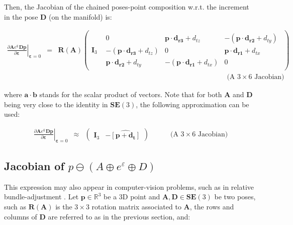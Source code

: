 \documentclass[a4paper,11pt]{report}
\newcommand{\E}{{\bm{\varepsilon}}}
\newcommand{\A}{{\mathbf{A}}}
\newcommand{\D}{{\mathbf{D}}}
\newcommand{\I}{{\mathbf{I}}}
\begin{document}
Then, the Jacobian of the chained poses-point composition w.r.t.
the increment in the pose $\D$ (on the manifold) is:

\begin{eqnarray}
\left. \frac{\partial \A e^\E \D \mathbf{p}}{\partial \E} \right|_{\E = 0}
&=&
\mathbf{R}(\A)
\left(
\begin{array}{c|c}
  \I_3 &
    \begin{array}{ccc}
      0  & \mathbf{p} \cdot \mathbf{d_{r3}} + d_{tz}  & -(\mathbf{p} \cdot \mathbf{d_{r2}} + d_{ty}) \\
      -(\mathbf{p} \cdot \mathbf{d_{r3}} + d_{tz})  & 0 & \mathbf{p} \cdot \mathbf{d_{r1}} + d_{tx} \\
      \mathbf{p} \cdot \mathbf{d_{r2}} + d_{ty}  & -(\mathbf{p} \cdot \mathbf{d_{r1}} + d_{tx}) & 0
    \end{array}
\end{array}
\right)
\\
&&
\quad \quad \quad \quad \quad \quad \quad \quad \quad \quad \quad \quad
\quad \quad \quad \quad \quad \quad \quad \quad \quad \quad \quad \quad
\text{(A $3 \times 6$ Jacobian)} \nonumber
\end{eqnarray}

\noindent where $\mathbf{a} \cdot \mathbf{b}$ stands for the scalar product of vectors.
Note that for both $\A$ and $\D$ being very close to the identity in $\mathbf{SE}(3)$,
the following approximation can be used:

\begin{eqnarray}
\left. \frac{\partial \A e^\E \D \mathbf{p}}{\partial \E} \right|_{\E = 0}
& \approx &
\left(
\begin{array}{cc}
  \I_3 &
  - \widehat{\left[ \mathbf{p} + \mathbf{d_t} \right]}
\end{array}
\right)
\quad \quad \quad
\text{(A $3 \times 6$ Jacobian)} \nonumber
\end{eqnarray}




\subsection{Jacobian of $p \ominus (A \oplus e^\varepsilon \oplus D)$}
\label{eq:jacob_pmA_e_D}

This expression may also appear in computer-vision problems,
such as in relative bundle-adjustment \cite{sibley2009rba}.
Let $\mathbf{p} \in \mathbb{R}^3$ be a 3D point
and $\A,\D \in \mathbf{SE}(3)$ be two poses, such as
$\mathbf{R}(\A)$ is the $3\times 3$ rotation matrix associated to $\A$,
the rows and columns of $\D$ are referred to as in the previous section,
and:
\end{document}
